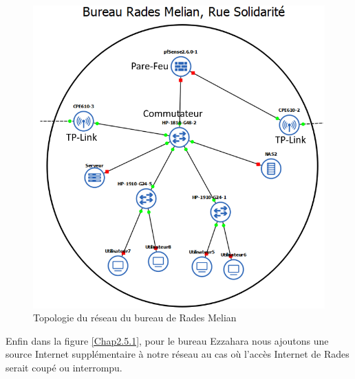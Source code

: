 \begin{figure}[H]
\centering
\includegraphics[width=15cm]{Images/BRadesMelian-Topologie.png}
\caption{Topologie du réseau du bureau de Rades Melian}
\label{Chap2.4.1}
\end{figure}

Enfin dans la figure \ref{Chap2.5.1}, pour le bureau Ezzahara nous ajoutons une source Internet supplémentaire à notre réseau au cas où l'accès Internet de Rades serait coupé ou interrompu.


